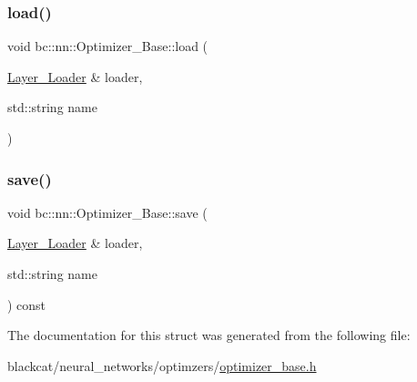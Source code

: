 \subsubsection{\texorpdfstring{load()}{load()}}
{\footnotesize\ttfamily void bc\+::nn\+::\+Optimizer\+\_\+\+Base\+::load (\begin{DoxyParamCaption}\item[{\hyperlink{structbc_1_1nn_1_1Layer__Loader}{Layer\+\_\+\+Loader} \&}]{loader,  }\item[{std\+::string}]{name }\end{DoxyParamCaption})\hspace{0.3cm}{\ttfamily [inline]}}

\mbox{\label{structbc_1_1nn_1_1Optimizer__Base_a23ebaa008029f146e95c3a0bcbdd91a6}} 
\subsubsection{\texorpdfstring{save()}{save()}}
{\footnotesize\ttfamily void bc\+::nn\+::\+Optimizer\+\_\+\+Base\+::save (\begin{DoxyParamCaption}\item[{\hyperlink{structbc_1_1nn_1_1Layer__Loader}{Layer\+\_\+\+Loader} \&}]{loader,  }\item[{std\+::string}]{name }\end{DoxyParamCaption}) const\hspace{0.3cm}{\ttfamily [inline]}}



The documentation for this struct was generated from the following file\+:\begin{DoxyCompactItemize}
\item 
blackcat/neural\+\_\+networks/optimzers/\hyperlink{optimizer__base_8h}{optimizer\+\_\+base.\+h}\end{DoxyCompactItemize}
